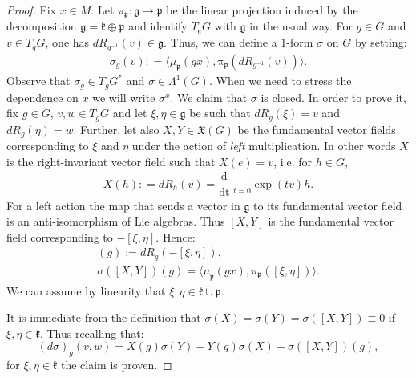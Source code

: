 \documentclass[leqno,11pt, a4]{amsart}
\theoremstyle{named}
\begin{document}
\begin{proof}
{Fix $x\in M$. Let $\pi_{\mathfrak{p}}: {\mathfrak{g}} {\longrightarrow} {\mathfrak{p}}$ be the linear projection induced by the decomposition ${\mathfrak{g}}={\mathfrak{k}}\oplus {\mathfrak{p}}$ and identify $T_eG$ with ${\mathfrak{g}}$ in the usual way. For $g\in G$ and $v\in T_gG$, one has $dR_{g{^{-1}}} (v) \in {\mathfrak{g}}$. Thus, we can define a $1$-form $\sigma$ on $G$ by setting:
\begin{gather*}
  \sigma_g(v) : = {\langle} {\mu_{\mathfrak{p}}}(g x) , {\operatorname{\pi_{\mathfrak{p}}}} (dR_{g{^{-1}}}(v)) {\rangle}.
\end{gather*}
Observe that $\sigma_g \in T_gG^*$ and $\sigma \in {\Lambda}^1(G)$.
}
 When we need to
stress the dependence on $x$ we will write $\sigma^x$. We claim that $\sigma$ is closed.
In order to prove it, fix $g\in G$, $v, w\in T_gG$ and let $\xi , \eta \in {\mathfrak{g}}$ be such
that $dR_g(\xi ) = v$ and $dR_g(\eta) = w$. Further, let also $X,Y\in {\mathfrak{X}}(G)$ be the
fundamental vector fields corresponding to $\xi $ and $\eta$ under the
action of \emph{left} multiplication.  In other words $X$ is the
right-invariant vector field such that $X(e) = {{v}} $, i.e. for $h\in G$,
\begin{gather*}
  X(h) : = dR_h({{v}} ) = {{\dfrac {\mathrm {d}  }{\mathrm {dt}}} \vert _{t=0} } \exp (t{{v}} ) h.
\end{gather*}
For a left action the map that sends a vector in ${\mathfrak{g}}$ to its
fundamental vector field is an anti-isomorphism of Lie algebras. Thus
$[X,Y]$ is the fundamental vector field corresponding to $-[\xi ,
\eta]$.
Hence:
\begin{gather*}
  [X,Y](g) := dR_g ( - [\xi , \eta]),\\
  \sigma( [X,Y])(g ) = {\langle} {\mu_{\mathfrak{p}}}(g x), {\operatorname{\pi_{\mathfrak{p}}}}([ \xi, \eta ]){\rangle}.
\end{gather*}
We can assume by linearity that $\xi , \eta \in {\mathfrak{k}} \cup  {\mathfrak{p}}$.

It is immediate from the definition that $\sigma(X) = \sigma (Y) =
\sigma ([X,Y]) \equiv 0$ if $\xi , \eta \in {\mathfrak{k}}$. Thus recalling that:
$$
 (d\sigma) _g (v, w) = X (g)  \sigma(Y) - Y(g)  \sigma(X) -
  \sigma([X,Y])(g),
$$
for $\xi , \eta \in {\mathfrak{k}}$ the claim is proven.


\end{proof}
\end{document}
